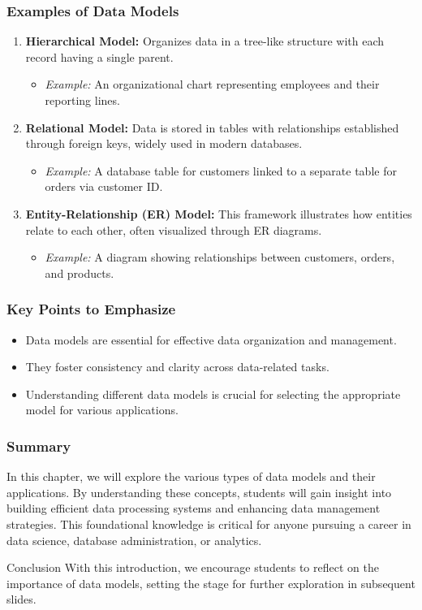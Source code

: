 \documentclass[aspectratio=169]{beamer}
\begin{document}
\begin{frame}[fragile]
  \frametitle{Examples of Data Models}
  \begin{enumerate}
    \item \textbf{Hierarchical Model:} 
    Organizes data in a tree-like structure with each record having a single parent. 
    \begin{itemize}
      \item \textit{Example:} An organizational chart representing employees and their reporting lines.
    \end{itemize}
    
    \item \textbf{Relational Model:} 
    Data is stored in tables with relationships established through foreign keys, widely used in modern databases. 
    \begin{itemize}
      \item \textit{Example:} A database table for customers linked to a separate table for orders via customer ID.
    \end{itemize}
    
    \item \textbf{Entity-Relationship (ER) Model:} 
    This framework illustrates how entities relate to each other, often visualized through ER diagrams. 
    \begin{itemize}
      \item \textit{Example:} A diagram showing relationships between customers, orders, and products.
    \end{itemize}
  \end{enumerate}
\end{frame}

\begin{frame}[fragile]
  \frametitle{Key Points to Emphasize}
  \begin{itemize}
    \item Data models are essential for effective data organization and management.
    \item They foster consistency and clarity across data-related tasks.
    \item Understanding different data models is crucial for selecting the appropriate model for various applications.
  \end{itemize}
\end{frame}

\begin{frame}[fragile]
  \frametitle{Summary}
  In this chapter, we will explore the various types of data models and their applications. By understanding these concepts, students will gain insight into building efficient data processing systems and enhancing data management strategies. This foundational knowledge is critical for anyone pursuing a career in data science, database administration, or analytics.

  \begin{block}{Conclusion}
    With this introduction, we encourage students to reflect on the importance of data models, setting the stage for further exploration in subsequent slides.
  \end{block}
\end{frame}
\end{document}
